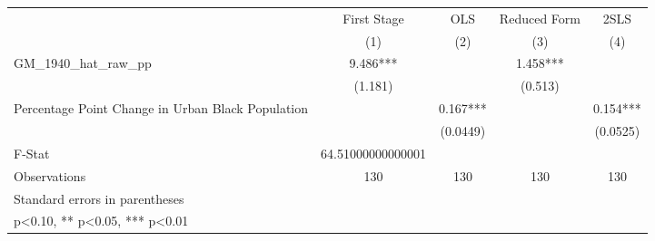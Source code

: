 {
\def\sym#1{\ifmmode^{#1}\else\(^{#1}\)\fi}
\begin{tabular}{l*{4}{c}}
\toprule
                    & First Stage   &         OLS   &Reduced Form   &        2SLS   \\
                    &\multicolumn{1}{c}{(1)}   &\multicolumn{1}{c}{(2)}   &\multicolumn{1}{c}{(3)}   &\multicolumn{1}{c}{(4)}   \\
\midrule
GM\_1940\_hat\_raw\_pp  &       9.486***&               &       1.458***&               \\
                    &     (1.181)   &               &     (0.513)   &               \\
\addlinespace
Percentage Point Change in Urban Black Population&               &       0.167***&               &       0.154***\\
                    &               &    (0.0449)   &               &    (0.0525)   \\
\midrule
F-Stat              &64.51000000000001   &               &               &               \\
Observations        &         130   &         130   &         130   &         130   \\
\bottomrule
\multicolumn{5}{l}{\footnotesize Standard errors in parentheses}\\
\multicolumn{5}{l}{\footnotesize * p<0.10, ** p<0.05, *** p<0.01}\\
\end{tabular}
}
